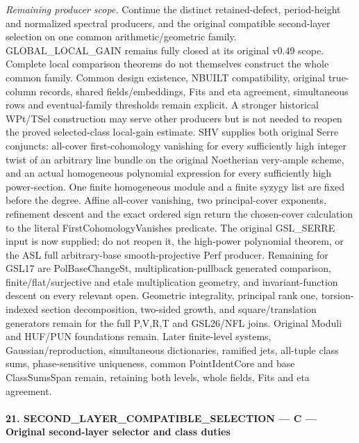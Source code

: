 \documentclass[11pt,a4paper]{article}
\numberwithin{equation}{section}
\theoremstyle{remark}\newtheorem{remark}[theorem]{Remark}
\begin{document}
\emph{Remaining producer scope.} Continue the distinct retained-defect, period-height and normalized spectral producers, and the original compatible second-layer selection on one common arithmetic/geometric family. GLOBAL\_\allowbreak LOCAL\_\allowbreak GAIN remains fully closed at its original v0.49 scope. Complete local comparison theorems do not themselves construct the whole common family. Common design existence, NBUILT compatibility, original true-column records, shared fields/embeddings, Fits and eta agreement, simultaneous rows and eventual-family thresholds remain explicit. A stronger historical WPt/TSel construction may serve other producers but is not needed to reopen the proved selected-class local-gain estimate. SHV supplies both original Serre conjuncts: all-cover first-cohomology vanishing for every sufficiently high integer twist of an arbitrary line bundle on the original Noetherian very-ample scheme, and an actual homogeneous polynomial expression for every sufficiently high power-section. One finite homogeneous module and a finite syzygy list are fixed before the degree. Affine all-cover vanishing, two principal-cover exponents, refinement descent and the exact ordered sign return the chosen-cover calculation to the literal FirstCohomologyVanishes predicate. The original GSL\_\allowbreak SERRE input is now supplied; do not reopen it, the high-power polynomial theorem, or the ASL full arbitrary-base smooth-projective Perf producer. Remaining for GSL17 are PolBaseChangeSt, multiplication-pullback generated comparison, finite/flat/surjective and etale multiplication geometry, and invariant-function descent on every relevant open. Geometric integrality, principal rank one, torsion-indexed section decomposition, two-sided growth, and square/translation generators remain for the full P,V,R,T and GSL26/NFL joins. Original Moduli and HUF/PUN foundations remain. Later finite-level systems, Gaussian/reproduction, simultaneous dictionaries, ramified jets, all-tuple class sums, phase-sensitive uniqueness, common PointIdentCore and base ClassSumsSpan remain, retaining both levels, whole fields, Fits and eta agreement.



\paragraph{21. SECOND\_\allowbreak LAYER\_\allowbreak COMPATIBLE\_\allowbreak SELECTION — C — Original second-layer selector and class duties}
\end{document}
